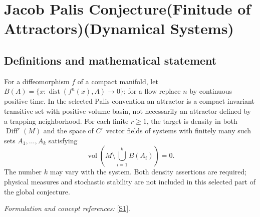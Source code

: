 \documentclass[11pt,a4paper]{article}
\newcommand{\sref}[2]{\hyperlink{source:#1:#2}{[S#2]}}
\newif\ifshowcatalogue
\newcommand{\cataloguescope}[1]{\ifshowcatalogue
 \paragraph{Exact scope in the supplied catalogue.}
 \begin{quote}\small #1\end{quote}\fi}
\begin{document}
\setcounter{section}{0}
\clearpage
\section*{\texorpdfstring{Jacob Palis Conjecture(Finitude of Attractors)(Dynamical Systems)}{Jacob Palis Conjecture(Finitude of Attractors)(Dynamical Systems)}}\label{statement}
\subsection{Definitions and mathematical statement}
For a diffeomorphism $f$ of a compact manifold, let
$B(A)=\{x:\operatorname{dist}(f^n(x),A)\to0\}$; for a flow replace $n$ by continuous positive time. In the selected Palis convention an attractor is a compact invariant transitive set with positive-volume basin, not necessarily an attractor defined by a trapping neighborhood. For each finite $r\ge1$, the target is density in both $\operatorname{Diff}^r(M)$ and the space of $C^r$ vector fields of systems with finitely many such sets $A_1,\ldots,A_k$ satisfying
\[
 \operatorname{vol}\left(M\setminus\bigcup_{i=1}^k B(A_i)\right)=0.
\]
The number $k$ may vary with the system. Both density assertions are required; physical measures and stochastic stability are not included in this selected part of the global conjecture.
\par\smallskip\textit{Formulation and concept references:} \sref{statement}{1}.
\cataloguescope{For every compact connected boundaryless smooth manifold M and every finite integer r >= 1, prove the conjunction of the following two density assertions: (i) in Diff\textasciicircum{}r(M) with its C\textasciicircum{}r topology there is a dense subset D whose elements f have finitely many attractors whose basins of attraction together cover M up to a set of smooth-volume measure zero; (ii) the same holds in the space X\textasciicircum{}r(M) of C\textasciicircum{}r vector fields with its C\textasciicircum{}r topology, for the attractors and basins of the generated flows. Attractor follows Palis (2005) Sections 2.1 and 2.3: a compact invariant set A that is transitive (has a dense orbit) and attracts a set of positive volume, its basin being the set of points whose forward orbit (or forward flow trajectory) converges to A. The finite number of attractors may depend on the element of D; no uniform bound is required. Volume-zero is independent of the choice of smooth positive density on M. This is the first bullet of Palis's Global Conjecture only; physical measures, stochastic stability, metric stability under parameter perturbation, and one-dimensional-family statements are separate conjectures not included.}
\end{document}
